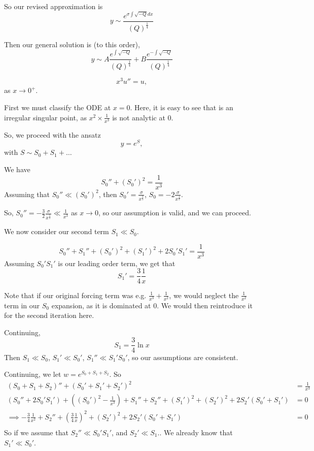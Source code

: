 \documentclass[a4paper]{article}
\begin{document}
So our revised approximation is
\[
	y \sim  \frac{e^{\sigma \int\sqrt{-Q} dx}}{(Q)^{\frac{1}{4}}}
\] 

Then our general solution is (to this order),
\[
	y \sim  A \frac{e^{\int \sqrt{-Q} }}{(Q)^{\frac{1}{4}}} + B \frac{e^{-\int \sqrt{-Q} }}{(Q)^{\frac{1}{4}}}
\] 

\begin{eg}
	\[
	x^3u'' = u
	,\] as $x \to  0^{+}$.

	First we must classify the ODE at $x=0$. Here, it is easy to see that is an irregular singular point, as  $x^2 \times  \frac{1}{x^3} $ is not analytic at $0$.

	So, we proceed with the ansatz 
	 \[
	y = e^{S}
	,\] with $S \sim S_0 + S_1 + \ldots$

	We have
	\[
		S_0'' + (S_0')^2 = \frac{1}{x^3}
	\] 
	Assuming that $S_0'' \ll (S_0')^2 $, then $S_0 ' = \frac{\sigma}{x^{\frac{3}{2}}}$, $S_0 = -2 \frac{\sigma}{x^{\frac{1}{2}}}$.

	So, $S_0'' = -\frac{3}{2} \frac{\sigma}{x^{\frac{5}{2}}} \ll \frac{1}{x^3}$ as $x\to 0$, so our assumption is valid, and we can proceed.

	We now consider our second term $S_1 \ll S_0$.

	\[
		S_0'' + S_1'' + (S_0')^2 + (S_1')^2 + 2S_0'S_1' = \frac{1}{x^3}
	\] 
	Assuming $S_0'S_1'$ is our leading order term, we get that
	\[
	S_1' = \frac{3}{4} \frac{1}{x}
	\]

	Note that if our original forcing term was e.g.  $\frac{1}{x^3} + \frac{1}{x^2}$, we would neglect the $\frac{1}{x^2}$ term in our $S_0$ expansion, as it is dominated at $0$. We would then reintroduce it for the second iteration here.

	Continuing,
	\[
	S_1 = \frac{3}{4} \ln x
	\]
	Then $S_1 \ll S_0$, $S_1' \ll S_0'$, $S_1'' \ll S_1'S_0'$, so our assumptions are consistent.
	
	Continuing, we let $w = e^{S_0 + S_1 + S_2}$. So
	\begin{align*}
		(S_0 + S_1 + S_2)'' + (S_0' + S_1' + S_2')^2 &= \frac{1}{x^3} \\
		(S_0'' + 2S_0'S_1') + ((S_0')^2 - \frac{1}{x^3}) + S_1 '' + S_2'' + (S_1')^2 + (S_2')^2 + 2S_2'(S_0' + S_1') &= 0 \\
		\implies -\frac{3}{4}\frac{1}{x^2} + S_2'' + \left(\frac{3}{4}\frac{1}{x}\right)^2 + (S_2')^2 + 2S_2'(S_0' + S_1') &= 0\\
	\end{align*}
	So if we assume that $S_2'' \ll S_0' S_1'$, and $S_2' \ll S_1.$. We already know that $S_1' \ll S_0'$.


\end{eg}
\end{document}
